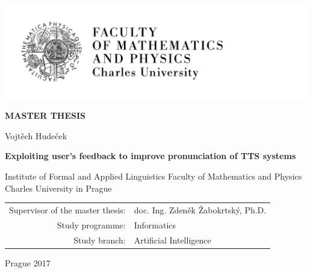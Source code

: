 

\pagestyle{empty}
\hypersetup{pageanchor=false}
\begin{center}

\centerline{\mbox{\includegraphics[width=166mm]{../img/logo-en.pdf}}}

\vspace{-8mm}
\vfill

{\bf\Large MASTER THESIS}

\vfill

{\LARGE Vojtěch Hudeček}

\vspace{15mm}

{\LARGE\bfseries{Exploiting user's feedback to improve pronunciation of TTS systems}}

\vfill

Institute of Formal and Applied Linguistics
Faculty of Mathematics and Physics
Charles University in Prague

\vfill

\begin{tabular}{rl}

Supervisor of the master thesis: & doc. Ing. Zdeněk Žabokrtský, Ph.D. \\
\noalign{\vspace{2mm}}
Study programme: & Informatics \\
\noalign{\vspace{2mm}}
Study branch: & Artificial Intelligence \\
\end{tabular}

\vfill

Prague 2017

\end{center}

\newpage


